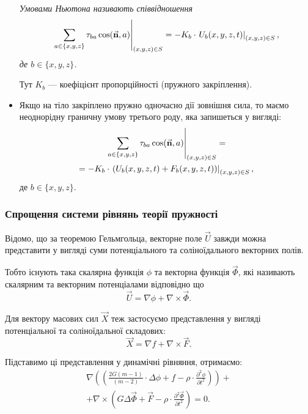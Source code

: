 \begin{itemize}
	\begin{definition}
		\it{Умовами Ньютона} називають співвідношення
		\begin{equation}
			\left. \displaystyle\sum\limits_{a \in \{x, y, z\}} \tau_{b a} \cos(\vec{\textbf{n}}, a) \right|_{(x, y, z) \in S} = - K_b \cdot \left. U_b(x, y, z, t) \right|_{(x, y, z) \in S},
		\end{equation}
		де $b \in \{x, y, z\}$.
	\end{definition}

	\begin{remark}
		Тут $K_b$ --- коефіцієнт пропорційності (пружного закріплення).
	\end{remark}

	\item Якщо на тіло закріплено пружно одночасно дії зовнішня сила, то маємо неоднорідну граничну умову третього роду, яка запишеться у вигляді:
	\begin{multline}
		\left. \displaystyle\sum\limits_{a \in \{x, y, z\}} \tau_{b a} \cos(\vec{\textbf{n}}, a) \right|_{(x, y, z) \in S} = \\
		= - K_b \cdot \left. \left( U_b(x, y, z, t) + F_b(x, y, z, t) \right) \right|_{(x, y, z) \in S},
	\end{multline}
	де $b \in \{x, y, z\}$.
\end{itemize}

\subsubsection{Спрощення системи рівнянь теорії пружності}

Відомо, що за теоремою Гельмгольца, векторне поле $\vec U$ завжди можна представити у вигляді суми потенціального та соліноїдального векторних полів. \medskip

Тобто існують така скалярна функція $\phi$ та векторна функція $\vec \Phi$, які називають скалярним та векторним потенціалами відповідно що
\begin{equation}
	\vec U = \nabla \phi + \nabla \times \vec \Phi.
\end{equation}

Для вектору масових сил $\vec X$ теж застосуємо представлення у вигляді потенціальної та соліноїдальної складових:
\begin{equation}
	\vec X = \nabla f + \nabla \times \vec F.
\end{equation}

Підставимо ці представлення у динамічні рівняння, отримаємо:
\begin{multline}
	\nabla \left( \left( \frac{2 G (m - 1)}{(m - 2)} \cdot \Delta \phi + f - \rho \cdot \frac{\partial^2 \phi}{\partial t^2} \right) \right) + \\
	+ \nabla \times \left( G \Delta \vec \Phi + \Vec F - \rho \cdot \frac{\partial^2 \vec \Phi}{\partial t^2} \right) = 0.
\end{multline}

